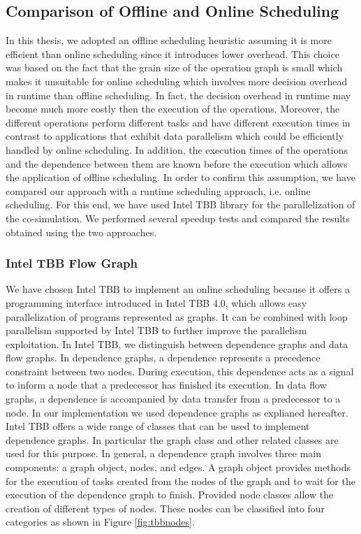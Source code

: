 \subsection{Comparison of Offline and Online Scheduling}

In this thesis, we adopted an offline scheduling heuristic assuming it is more efficient than online scheduling since it introduces lower overhead. This choice was based on the fact that the grain size of the operation graph is small which makes it unsuitable for online scheduling which involves more decision overhead in runtime than offline scheduling. In fact, the decision overhead in runtime may become much more costly then the execution of the operations. Moreover, the different operations perform different tasks and have different execution times in contrast to applications that exhibit data parallelism which could be efficiently handled by online scheduling. In addition, the execution times of the operations and the dependence between them are known before the execution which allows the application of offline scheduling. In order to confirm this assumption, we have compared our approach with a runtime scheduling approach, i.e. online scheduling. For this end, we have used Intel TBB library for the parallelization of the co-simulation. We performed several speedup tests and compared the results obtained using the two approaches.

\subsubsection{Intel TBB Flow Graph}

We have chosen Intel TBB to implement an online scheduling because it offers a programming interface introduced in Intel TBB 4.0, which allows easy parallelization of programs represented as graphs. 
It can be combined with loop parallelism supported by Intel TBB to further improve the parallelism exploitation. 
In Intel TBB, we distinguish between dependence graphs and data flow graphs.
In dependence graphs, a dependence represents a precedence constraint between two nodes. During execution, this dependence acts as a signal to inform a node that a predecessor has finished its execution. 
In data flow graphs, a dependence is accompanied by data transfer from a predecessor to a node.
In our implementation we used dependence graphs as explianed hereafter.
Intel TBB offers a wide range of classes that can be used to implement dependence graphs. In particular the graph class and other related classes are used for this purpose. In general, a dependence graph involves three main components: a graph object, nodes, and edges. A graph object provides methods for the execution of tasks created from the nodes of the graph and to wait for the execution of the dependence graph to finish.
Provided node classes allow the creation of different types of nodes. These nodes can be classified into four categories as shown in Figure \ref{fig:tbbnodes}.

